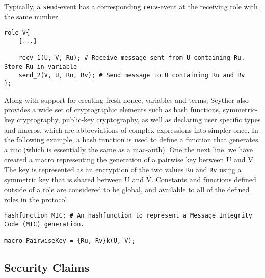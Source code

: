 Typically, a \texttt{send}-event has a corresponding \texttt{recv}-event at the receiving role with the same number.\newline

\begin{lstlisting}
role V{
	[...]
	
	recv_1(U, V, Ru); # Receive message sent from U containing Ru. Store Ru in variable
	send_2(V, U, Ru, Rv); # Send message to U containing Ru and Rv
};
\end{lstlisting}

Along with support for creating fresh nonce, variables and terms, Scyther also provides a wide set of cryptographic elements such as hash functions, symmetric-key cryptography, public-key cryptography, as well as declaring user specific types and macros, which are abbreviations of complex expressions into simpler once. In the following example, a hash function is used to define a function that generates a \gls{mic} (which is essentially the same as a \gls{mac-auth}). One the next line, we have created a macro representing the generation of a pairwise key between U and V. The key is represented as an encryption of the two values \texttt{Ru} and \texttt{Rv} using a symmetric key that is shared between U and V. Constants and functions defined outside of a role are considered to be global, and available to all of the defined roles in the protocol.\newline

\begin{lstlisting}
hashfunction MIC; # An hashfunction to represent a Message Integrity Code (MIC) generation.

macro PairwiseKey = {Ru, Rv}k(U, V);
\end{lstlisting}



%	

\subsection{Security Claims}

